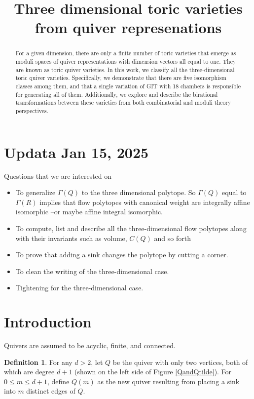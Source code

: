 \documentclass[11pt]{amsart}
\title{
Three dimensional toric varieties from quiver represenations
}
\date{}
\theoremstyle{plain}
\theoremstyle{definition}
\newtheorem{definition}[theorem]{Definition}
\begin{document}
\begin{abstract}
For a given dimension, there are only a finite number of toric varieties that emerge as moduli spaces of quiver representations with dimension vectors all equal to one. They are known as toric quiver varieties. In this work, we classify all the three-dimensional toric quiver varieties. Specifically, we demonstrate that there are five isomorphism classes among them, and that a single variation of GIT with 18 chambers is responsible for generating all of them. Additionally, we explore and describe the birational transformations between these varieties from both combinatorial and moduli theory perspectives.
\end{abstract}
\maketitle

\section{Updata Jan 15, 2025}

Questions that we are interested on
\begin{itemize}
    \item To generalize $\Gamma(Q)$ to the three dimensional polytope. So $\Gamma(Q) $ equal to $\Gamma(R)$ implies that flow polytopes with canonical weight are integrally affine isomorphic --or maybe affine integral isomorphic. 
    \item To compute, list and describe all the three-dimensional flow polytopes along with their invariants such as volume, $C(Q)$ and so forth
    \item[1.] To prove that adding a sink changes the polytope by cutting a corner.  
    \item To clean the writing of the three-dimensional case.
    \item Tightening for the three-dimensional case. 
\end{itemize}


\section{Introduction}
\noindent Quivers are assumed to be acyclic, finite, and connected.

\begin{definition}
For any $d > 2$, let $Q$ be the quiver with only two vertices, both of which are degree $d+1$ (shown on the left side of Figure \ref{QandQtilde}). For $0 \leq m \leq d + 1$, define $Q(m)$ as the new quiver resulting from placing a sink into $m$ distinct edges of $Q$.
\end{definition} 
\end{document}
